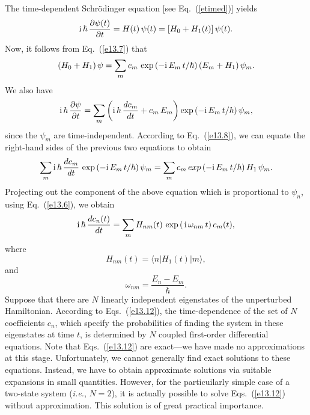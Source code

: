 The time-dependent Schr\"{o}dinger equation [see Eq.~(\ref{etimed})]
yields
\begin{equation}\label{e13.8}
{\rm i}\,\hbar\,\frac{\partial\psi(t)}{\partial t} = H(t)\,\psi(t)
= [H_0+H_1(t)]\,\psi(t).
\end{equation}
Now, it follows from Eq.~(\ref{e13.7}) that
\begin{equation}
(H_0+H_1)\,\psi = \sum_m c_m\,\exp\left(-{\rm i}\,E_m\,t/\hbar\right)(E_m+H_1)\,\psi_m.
\end{equation}
We also have
\begin{equation}
{\rm i}\,\hbar\,\frac{\partial\psi}{\partial t} = 
\sum_m\left({\rm i}\,\hbar\,\frac{d c_m}{dt}+ c_m\,E_m\right)
\exp\left(-{\rm i}\,E_m\,t/\hbar\right)\psi_m,
\end{equation}
since the $\psi_m$ are time-independent. According to
Eq.~(\ref{e13.8}), we can equate the right-hand sides of the previous
two equations to obtain
\begin{equation}
\sum_m {\rm i}\,\hbar\,\frac{dc_m}{dt}\,\exp\left(-{\rm i}\,E_m\,t/\hbar\right)\psi_m = \sum_m c_m\,exp\left(-{\rm i}\,E_m\,t/\hbar\right)H_1\,\psi_m.
\end{equation}
Projecting out the component of the above equation which is proportional
to $\psi_n$, using Eq.~(\ref{e13.6}), we obtain
\begin{equation}\label{e13.12}
{\rm i}\,\hbar\,\frac{dc_n(t)}{dt} = \sum_m H_{nm}(t)\,\exp\left(\,{\rm i}\,
\omega_{nm}\,t\right)c_m(t),
\end{equation}
where
\begin{equation}
H_{nm}(t) = \langle n|H_1(t)|m\rangle,
\end{equation}
and
\begin{equation}
\omega_{nm} = \frac{E_n-E_m}{\hbar}.
\end{equation}
Suppose that there are $N$ linearly independent eigenstates of
the unperturbed Hamiltonian. According to Eqs.~(\ref{e13.12}),
the time-dependence of the set of $N$ coefficients $c_n$, which specify the
probabilities of finding the system in these eigenstates  at time $t$, is determined
by $N$ coupled first-order differential equations. Note that Eqs.~(\ref{e13.12})
are exact---we have made no approximations at this stage. Unfortunately,
we cannot generally find exact solutions to these equations. Instead, we
have to obtain approximate solutions via suitable
expansions in small quantities. However, for the particuilarly
simple case of a two-state system  ({\em i.e.}, $N=2$), it is actually
possible to solve Eqs.~(\ref{e13.12}) without approximation. This solution
is of great practical importance.

